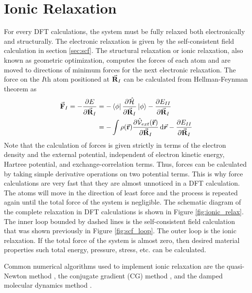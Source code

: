 \section{Ionic Relaxation}
For every DFT calculations, the system must be fully relaxed both electronically and structurally. The electronic relaxation is given by the self-consistent field calculation in section \ref{sec:scf}. The structural relaxation or ionic relaxation, also known as geometric optimization, computes the forces of each atom and are moved to  directions of minimum forces for the next electronic relaxation. The force on the $I$th atom  positioned at $\va{R}_I$ can be calculated from Hellman-Feynman theorem as \citep{Hellman1937,Feynman1939}
\begin{align}
	\va{F}_I =  - \pdv{E}{\va{R}_I} & = - \bra{\phi} \pdv{ \hat{\mathcal{H}}}{\va{R}_I} \ket{\phi} - \pdv{E_{II}}{\va{R}_I}                          \\
	                                & = - \int \rho({\va{r}}) \pdv{\hat{\mathcal{V}}_{ext}(\va{r})}{\va{R}_I}  \dd{\va*{r}} - \pdv{E_{II}}{\va{R}_I}
\end{align}
Note that the calculation of forces is given strictly in terms of the electron density and the external potential, independent of electron kinetic energy, Hartree potential, and exchange-correlation terms. Thus, forces can be calculated by taking simple derivative operations on two potential terms. This is why force calculations are very fast that they are almost unnoticed in a  DFT calculation. The atoms will move in the direction of least force and the process is repeated again until the total force of the system is negligible. The schematic diagram of the complete relaxation in DFT calculations is shown in Figure \ref{fig:ionic_relax}. The inner loop bounded by dashed lines is the self-consistent field calculation that was shown previously in Figure \ref{fig:scf_loop}. The outer loop is the ionic relaxation. If the total force of the system is almost zero, then desired material properties such total energy, pressure, stress, etc. can be calculated.

Common numerical algorithms used to implement ionic relaxation are the quasi-Newton method \citep{Curtis2015}, the conjugate gradient (CG) method \citep{Dai1999}, and the damped molecular dynamics method \citep{Probert2003}.



